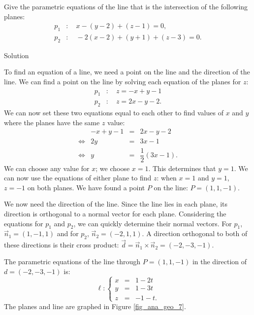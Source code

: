 \begin{example}\label{ex_planes4}
Give the parametric equations of the line that is the intersection of the following planes:
\begin{align*}
p_1&:\quad x-(y-2)+(z-1) =0, \\
p_2&:\quad -2(x-2)+(y+1)+(z-3)=0.
\end{align*}

Solution 

To find an equation of a line, we need a point on the line and the direction of the line. We can find a point on the line by solving each equation of the planes for $z$:
\begin{align*}
p_1&:\quad z = -x+y-1 \\
p_2&:\quad z = 2x-y-2.
\end{align*}
We can now set these two equations equal to each other to find values of $x$ and $y$ where the planes have the same $z$ value:
$$
\begin{array}{rrcl}
&-x+y-1 &=& 2x-y-2 \\
\Leftrightarrow&2y &=& 3x-1\\
\Leftrightarrow&y &=& \dfrac12(3x-1).
\end{array}
$$
We can choose any value for $x$; we choose $x=1$. This determines that $y=1$. We can now use the equations of either plane to find $z$: when $x=1$ and $y=1$, $z=-1$ on both planes. We have found a point $P$  on the line: $P= (1,1,-1)$. 

We now need the direction of the line. Since the line lies in each plane, its direction is orthogonal to a normal vector for each plane. Considering the equations for $p_1$ and $p_2$, we can quickly determine their normal vectors. For $p_1$, $\vec n_1 = ( 1,-1,1)$ and for $p_2$, $\vec n_2 = ( -2,1,1).$ A direction orthogonal to both of these directions is their cross product: $\vec d = \vec n_1\times \vec n_2 = ( -2,-3,-1).$

The parametric equations of the line through $P=(1,1,-1)$ in the direction of $d=( -2,-3,-1)$ is:
$$\ell: \left\{\begin{array}{lcl} x &=& 1-2t\\ y&=&1-3t \\ z&=&-1-t.\end{array}\right.
$$
The planes and line are graphed in Figure \ref{fig_ana_geo_7}.



\end{example}
